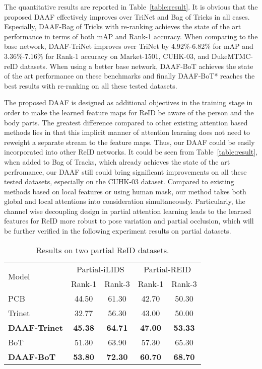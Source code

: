 \documentclass[10pt,twocolumn,letterpaper]{article}
\begin{document}
The quantitative results are reported in Table~\ref{table:result}. It is obvious that the proposed DAAF effectively improves over TriNet and Bag of Tricks in all cases. Especially, DAAF-Bag of Tricks with re-ranking achieves the state of the art performance in terms of both mAP and Rank-1 accuracy. When comparing to the base network, DAAF-TriNet improves over TriNet by 4.92\%-6.82\% for mAP and 3.36\%-7.16\% for Rank-1 accuracy on Market-1501, CUHK-03, and DukeMTMC-reID datasets. When using a better base network, DAAF-BoT achieves the state of the art performance on these benchmarks and finally DAAF-BoT* reaches the best results with re-ranking on all these tested datasets. 


The proposed DAAF is designed as additional objectives in the training stage in order to make the learned feature maps for ReID be aware of the person and the body parts. The greatest difference compared to other existing attention based methods lies in that this implicit manner of attention learning does not need to reweight a separate stream to the feature maps. Thus, our DAAF could be easily incorporated into other ReID networks. It could be seen from Table~\ref{table:result}, when added to Bag of Tracks, which already achieves the state of the art perfromance, our DAAF still could bring significant improvements on all these tested datasets, especially on the CUHK-03 dataset. Compared to existing methods based on local features or using human mask, our method takes both global and local attentions into consideration simultaneously. Particularly, the channel wise decoupling design in partial attention learning leads to the learned features for ReID more robust to pose variation and partial occlusion, which will be further verified in the following experiment results on partial datasets.

\begin{table}[h]
	\begin{center}
		\begin{tabular}{lcccc}
			\hline
			\multirow{2}[1]{*}{Model} & \multicolumn{2}{c}{Partial-iLIDS} & \multicolumn{2}{c}{Partial-REID} \bigstrut\\
			\cline{2-5}  & Rank-1 & Rank-3 & Rank-1 & Rank-3 \bigstrut\\
			\hline
PCB~\cite{sun2018beyond} & 44.50 & 61.30 & 42.70 & 50.30\bigstrut[t]\\
			Trinet 		 			& 32.77 & 56.30 & 43.00 & 50.00\\
			\textbf{DAAF-Trinet} 	& \textbf{45.38} & \textbf{64.71} & \textbf{47.00} & \textbf{53.33}\\
BoT 				& 51.30 & 63.90 & 57.30 & 65.30\\
			\textbf{DAAF-BoT} & \textbf{53.80} & \textbf{72.30} & \textbf{60.70} & \textbf{68.70} \bigstrut[b]\\
\hline
		\end{tabular}
	\end{center}
	\caption{Results on two partial ReID datasets.}
	\label{partial_dataset_experiment}
\end{table}
\end{document}
